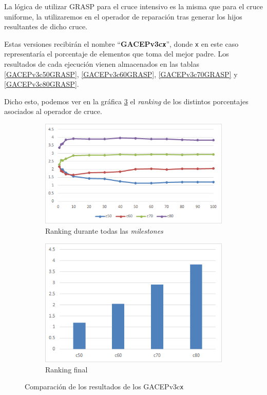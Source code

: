 La lógica de utilizar GRASP para el cruce intensivo es la misma que para el cruce uniforme, la utilizaremos en el operador de reparación tras generar los hijos resultantes de dicho cruce. 

Estas versiones recibirán el nombre ``\textbf{GACEPv3c\texttt{x}}'', donde \texttt{x} en este caso representaría el porcentaje de elementos que toma del mejor padre. 
Los resultados de cada ejecución vienen almacenados en las tablas \ref{GACEPv3c50GRASP}, \ref{GACEPv3c60GRASP}, \ref{GACEPv3c70GRASP} y \ref{GACEPv3c80GRASP}.

Dicho esto, podemos ver en la gráfica \ref{fig:GACEPcGRASP} el \textit{ranking} de los distintos porcentajes asociados al operador de cruce.

\begin{figure}[h]
     \centering
     \begin{subfigure}[b]{0.45\textwidth}
         \centering
         \includegraphics[width=\textwidth]{imagenes/Experimental/GACEPcGRASP.png}
         \caption{Ranking durante todas las \textit{milestones}}
         \label{fig:GACEPv3cGRASP_lineas}
     \end{subfigure}
     \hfill
     \begin{subfigure}[b]{0.45\textwidth}
         \centering
         \includegraphics[width=\textwidth]{imagenes/Experimental/barras/GACEPcGRASP.png}
         \caption{Ranking final}
         \label{fig:GACEPv3cGRASP_barras}
     \end{subfigure}
        \caption{Comparación de los resultados de los GACEPv3c\texttt{x}}
        \label{fig:GACEPcGRASP}
\end{figure}

